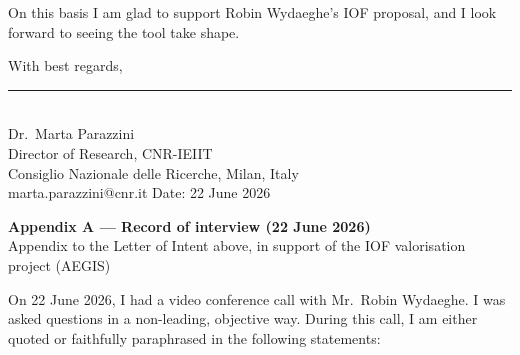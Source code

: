 \documentclass[11pt]{article}
\begin{document}
On this basis I am glad to support Robin Wydaeghe's IOF proposal, and I look forward to seeing
the tool take shape.

\bigskip
With best regards,

\vspace{2.2cm}

\rule{6cm}{0.4pt}\\
Dr.\ Marta Parazzini\\
Director of Research, CNR-IEIIT\\
Consiglio Nazionale delle Ricerche, Milan, Italy\\
marta.parazzini@cnr.it \hfill Date: 22 June 2026

\newpage

\begin{center}
\textbf{\large Appendix A --- Record of interview (22 June 2026)}\\[0.3em]
Appendix to the Letter of Intent above, in support of the IOF valorisation project (AEGIS)
\end{center}

\bigskip
On 22 June 2026, I had a video conference call with Mr.\ Robin Wydaeghe. I was asked
questions in a non-leading, objective way. During this call, I am either quoted or faithfully
paraphrased in the following statements:
\end{document}
